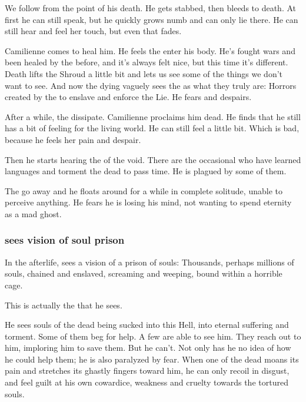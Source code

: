 We follow \Icor{} from the point of his death. He gets stabbed, then bleeds to death. At first he can still speak, but he quickly grows numb and can only lie there. He can still hear \Tiroco{} and feel her touch, but even that fades. 

Camilienne comes to heal him. He feels the \Sephiroth{} enter his body. He's fought wars and been healed by the \Sephiroth{} before, and it's always felt nice, but this time it's different. Death lifts the Shroud a little bit and lets us see some of the things we don't want to see. And now the dying \Icor{} vaguely sees the \Sephiroth{} as what they truly are: Horrors created by the \banes{} to enslave \humanity{} and enforce the Lie. He fears and despairs. 

After a while, the \Sephiroth{} dissipate. Camilienne proclaims him dead. He finds that he still has a bit of feeling for the living world. He can still feel \Tiroco{} a little bit. Which is bad, because he feels her pain and despair. 

Then he starts hearing the \daemons{} of the void. There are the occasional \daemons{} who have learned \Miithian{} languages and torment the dead to pass time. He is plagued by some of them. 

The \daemons{} go away and he floats around for a while in complete solitude, unable to perceive anything. He fears he is losing his mind, not wanting to spend eternity as a mad ghost. 






\subsubsection{\Icor{} sees vision of soul prison}
In the afterlife, \Icor{} sees a vision of a prison of souls: Thousands, perhaps millions of souls, chained and enslaved, screaming and weeping, bound within a horrible cage. 

This is actually the \Sephiroth{} that he sees. 

He sees souls of the dead being sucked into this Hell, into eternal suffering and torment. Some of them beg for help. A few are able to see him. They reach out to him, imploring him to save them. But he can't. Not only has he no idea of how he could help them; he is also paralyzed by fear. When one of the dead moans its pain and stretches its ghastly fingers toward him, he can only recoil in disgust, and feel guilt at his own cowardice, weakness and cruelty towards the tortured souls. 

